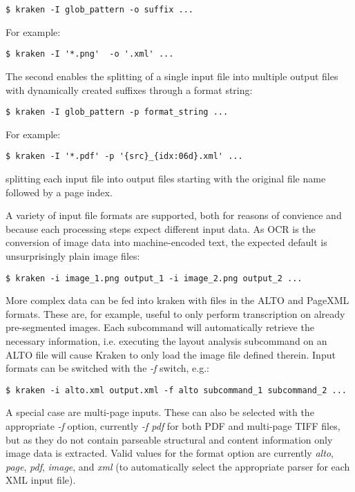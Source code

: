 \begin{verbatim}
$ kraken -I glob_pattern -o suffix ...
\end{verbatim}

For example:

\begin{verbatim}
$ kraken -I '*.png'  -o '.xml' ...
\end{verbatim}

The second enables the splitting of a single input file into multiple output
files with dynamically created suffixes through a format string:

\begin{verbatim}
$ kraken -I glob_pattern -p format_string ...
\end{verbatim}

For example:

\begin{verbatim}
$ kraken -I '*.pdf' -p '{src}_{idx:06d}.xml' ...
\end{verbatim}

splitting each input file into output files starting with the original file
name followed by a page index.

A variety of input file formats are supported, both for reasons of convience
and because each processing steps expect different input data. As OCR is the
conversion of image data into machine-encoded text, the expected default is
unsurprisingly plain image files:

\begin{verbatim}
$ kraken -i image_1.png output_1 -i image_2.png output_2 ...
\end{verbatim}

More complex data can be fed into kraken with files in the ALTO and PageXML
formats. These are, for example, useful to only perform transcription on
already pre-segmented images. Each subcommand will automatically retrieve the
necessary information, i.e. executing the layout analysis subcommand on an ALTO
file will cause Kraken to only load the image file defined therein. Input
formats can be switched with the \emph{-f} switch, e.g.:

\begin{verbatim}
$ kraken -i alto.xml output.xml -f alto subcommand_1 subcommand_2 ...
\end{verbatim}

A special case are multi-page inputs. These can also be selected with the
appropriate \emph{-f} option, currently \emph{-f pdf} for both PDF and
multi-page TIFF files, but as they do not contain parseable structural and
content information only image data is extracted. Valid values for the format
option are currently \emph{alto}, \emph{page}, \emph{pdf}, \emph{image}, and
\emph{xml} (to automatically select the appropriate parser for each XML input
file).

